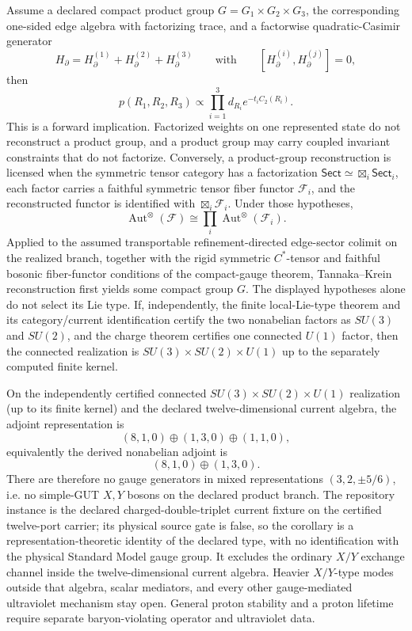\begin{theorem}
Assume a declared compact product group
\(G=G_1\times G_2\times G_3\), the corresponding one-sided edge algebra
with factorizing trace, and a factorwise quadratic-Casimir generator
\[
H_\partial=H_\partial^{(1)}+H_\partial^{(2)}+H_\partial^{(3)}
\qquad\text{with}\qquad
[H_\partial^{(i)},H_\partial^{(j)}]=0,
\]
then
\[
p(R_1,R_2,R_3)\propto\prod_{i=1}^3 d_{R_i}e^{-t_iC_2(R_i)}.
\]
This is a forward implication. Factorized weights on one represented state
do not reconstruct a product group, and a product group may carry coupled
invariant constraints that do not factorize. Conversely, a product-group
reconstruction is licensed when the symmetric tensor category has a
factorization
\(\mathsf{Sect}\simeq\boxtimes_i\mathsf{Sect}_i\), each factor carries a
faithful symmetric tensor fiber functor \(\mathcal F_i\), and the reconstructed
functor is identified with \(\boxtimes_i\mathcal F_i\). Under those hypotheses,
\[
\operatorname{Aut}^{\otimes}(\mathcal F)
\cong
\prod_i\operatorname{Aut}^{\otimes}(\mathcal F_i).
\]
Applied to the assumed transportable refinement-directed edge-sector colimit
on the realized branch, together with the rigid symmetric \(C^*\)-tensor and
faithful bosonic fiber-functor conditions of the compact-gauge theorem,
Tannaka--Krein reconstruction first yields some compact group \(G\). The
displayed hypotheses alone do not select its Lie type. If, independently, the
finite local-Lie-type theorem and its category/current identification certify
the two nonabelian factors as \(SU(3)\) and \(SU(2)\), and the charge theorem
certifies one connected \(U(1)\) factor, then the connected realization is
\(SU(3)\times SU(2)\times U(1)\) up to the separately computed finite kernel.
\end{theorem}

\begin{corollary}
On the independently certified connected
\(SU(3)\times SU(2)\times U(1)\) realization (up to its finite kernel) and
the declared twelve-dimensional current algebra, the adjoint representation
is
\[
(8,1,0)\oplus(1,3,0)\oplus(1,1,0),
\]
equivalently the derived nonabelian adjoint is
\[
(8,1,0)\oplus(1,3,0).
\]
There are therefore no gauge generators in mixed representations
\((3,2,\pm5/6)\), i.e. no simple-GUT \(X,Y\) bosons on the declared product
branch. The repository instance is the declared charged-double-triplet
current fixture on the certified twelve-port carrier; its physical source
gate is false, so the corollary is a representation-theoretic identity of the
declared type, with no identification with the physical Standard Model gauge
group. It excludes the ordinary \(X/Y\) exchange channel inside the
twelve-dimensional current algebra. Heavier \(X/Y\)-type modes outside that
algebra, scalar mediators, and every other gauge-mediated ultraviolet
mechanism stay open. General proton stability and a proton lifetime require
separate baryon-violating operator and ultraviolet data.
\end{corollary}

